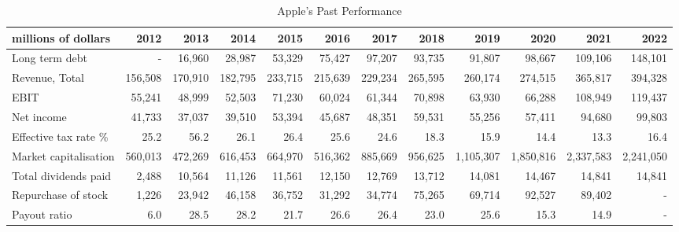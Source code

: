 \begin{table}[ht]
    \centering
    \caption{Apple's Past Performance}
    \label{my-label}
    \tiny
    \begin{tabular}{|l|r|r|r|r|r|r|r|r|r|r|r|}
    \hline
    \textbf{millions of dollars} & \textbf{2012} & \textbf{2013} & \textbf{2014} & \textbf{2015} & \textbf{2016} & \textbf{2017} & \textbf{2018} & \textbf{2019} & \textbf{2020} & \textbf{2021} & \textbf{2022} \\ \hline
    Long term debt               & -             & 16,960        & 28,987        & 53,329        & 75,427        & 97,207        & 93,735        & 91,807        & 98,667        & 109,106       & 148,101       \\ \hline
    Revenue, Total               & 156,508       & 170,910       & 182,795       & 233,715       & 215,639       & 229,234       & 265,595       & 260,174       & 274,515       & 365,817       & 394,328       \\ \hline
    EBIT                         & 55,241        & 48,999        & 52,503        & 71,230        & 60,024        & 61,344        & 70,898        & 63,930        & 66,288        & 108,949       & 119,437       \\ \hline
    Net income                   & 41,733        & 37,037        & 39,510        & 53,394        & 45,687        & 48,351        & 59,531        & 55,256        & 57,411        & 94,680        & 99,803        \\ \hline
    Effective tax rate \%         & 25.2          & 56.2          & 26.1          & 26.4          & 25.6          & 24.6          & 18.3          & 15.9          & 14.4          & 13.3          & 16.4          \\ \hline
    Market capitalisation        & 560,013       & 472,269       & 616,453       & 664,970       & 516,362       & 885,669       & 956,625       & 1,105,307     & 1,850,816     & 2,337,583     & 2,241,050     \\ \hline
    Total dividends paid         & 2,488         & 10,564        & 11,126        & 11,561        & 12,150        & 12,769        & 13,712        & 14,081        & 14,467        & 14,841        & 14,841        \\ \hline
    Repurchase of stock          & 1,226         & 23,942        & 46,158        & 36,752        & 31,292        & 34,774        & 75,265        & 69,714        & 92,527        & 89,402        & -             \\ \hline
    Payout ratio                 & 6.0           & 28.5          & 28.2          & 21.7          & 26.6          & 26.4          & 23.0          & 25.6          & 15.3          & 14.9          & -             \\ \hline

\end{tabular}
\end{table}
